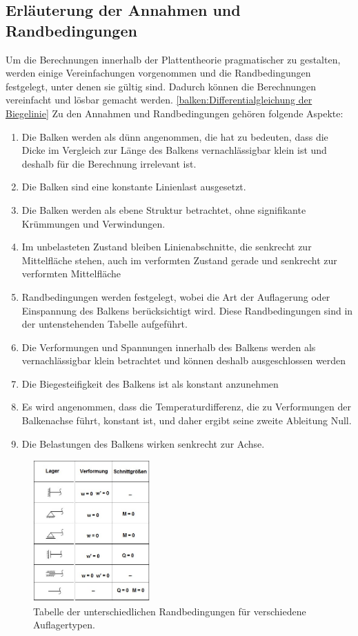 \subsection{Erläuterung der Annahmen und Randbedingungen}
Um die Berechnungen innerhalb der Plattentheorie pragmatischer zu gestalten, werden einige Vereinfachungen vorgenommen und die Randbedingungen festgelegt, unter denen sie gültig sind.
Dadurch können die Berechnungen vereinfacht und lösbar gemacht werden. \ref{balken:Differentialgleichung der Biegelinie}
Zu den Annahmen und Randbedingungen gehören folgende Aspekte:

\begin{enumerate}
	\item Die Balken werden als dünn angenommen, die hat zu bedeuten, dass die Dicke im Vergleich zur Länge des Balkens vernachlässigbar klein ist und deshalb für die Berechnung irrelevant ist.
	\item Die Balken sind eine konstante Linienlast ausgesetzt.
	\item Die Balken werden als ebene Struktur betrachtet, ohne signifikante Krümmungen und Verwindungen.
	\item Im unbelasteten Zustand bleiben Linienabschnitte, die senkrecht zur Mittelfläche stehen, auch im verformten Zustand gerade und senkrecht zur verformten Mittelfläche
	\item Randbedingungen werden festgelegt, wobei die Art der Auflagerung oder Einspannung des Balkens berücksichtigt wird.
	Diese Randbedingungen sind in der untenstehenden Tabelle aufgeführt.
	\item Die Verformungen und Spannungen innerhalb des Balkens werden als vernachlässigbar klein betrachtet und können deshalb ausgeschlossen werden
	\item Die Biegesteifigkeit des Balkens ist als konstant anzunehmen
	\item Es wird angenommen, dass die Temperaturdifferenz, die zu Verformungen der Balkenachse führt, konstant ist, und daher ergibt seine zweite Ableitung Null.
	\item Die Belastungen des Balkens wirken senkrecht zur Achse.
\end{enumerate}
\begin{figure}
\begin{center}
	\includegraphics[width=0.4\textwidth]{papers/balken/images/teil2/Randbedingungen.jpg}
\end{center}
\caption{Tabelle der unterschiedlichen Randbedingungen für verschiedene Auflagertypen.}
\end{figure}
